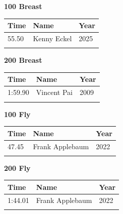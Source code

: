 \hfill
\begin{minipage}[t]{0.48\textwidth}
\centering
\textbf{\textcolor{teamprimary}{100 Breast}}\par
\vspace{0.5em}
\centering
\small
\renewcommand{\arraystretch}{1.0}
\setlength{\tabcolsep}{4pt}
\begin{tabular}{@{}p{1.8cm}p{3.0cm}p{1.0cm}@{}}
\toprule
\textbf{Time} & \textbf{Name} & \textbf{Year} \\
\midrule
55.50 & Kenny Eckel & 2025 \\
\bottomrule
\vspace{0.5em}
\end{tabular}
\end{minipage}
\vspace{1.2em}
\noindent\begin{minipage}[t]{0.48\textwidth}
\centering
\textbf{\textcolor{teamprimary}{200 Breast}}\par
\vspace{0.5em}
\centering
\small
\renewcommand{\arraystretch}{1.0}
\setlength{\tabcolsep}{4pt}
\begin{tabular}{@{}p{1.8cm}p{3.0cm}p{1.0cm}@{}}
\toprule
\textbf{Time} & \textbf{Name} & \textbf{Year} \\
\midrule
1:59.90 & Vincent Pai & 2009 \\
\bottomrule
\vspace{0.5em}
\end{tabular}
\end{minipage}
\hfill
\begin{minipage}[t]{0.48\textwidth}
\centering
\textbf{\textcolor{teamprimary}{100 Fly}}\par
\vspace{0.5em}
\centering
\small
\renewcommand{\arraystretch}{1.0}
\setlength{\tabcolsep}{4pt}
\begin{tabular}{@{}p{1.8cm}p{3.0cm}p{1.0cm}@{}}
\toprule
\textbf{Time} & \textbf{Name} & \textbf{Year} \\
\midrule
47.45 & Frank Applebaum & 2022 \\
\bottomrule
\vspace{0.5em}
\end{tabular}
\end{minipage}
\vspace{1.2em}
\noindent\begin{minipage}[t]{0.48\textwidth}
\centering
\textbf{\textcolor{teamprimary}{200 Fly}}\par
\vspace{0.5em}
\centering
\small
\renewcommand{\arraystretch}{1.0}
\setlength{\tabcolsep}{4pt}
\begin{tabular}{@{}p{1.8cm}p{3.0cm}p{1.0cm}@{}}
\toprule
\textbf{Time} & \textbf{Name} & \textbf{Year} \\
\midrule
1:44.01 & Frank Applebaum & 2022 \\
\bottomrule
\vspace{0.5em}
\end{tabular}
\end{minipage}
